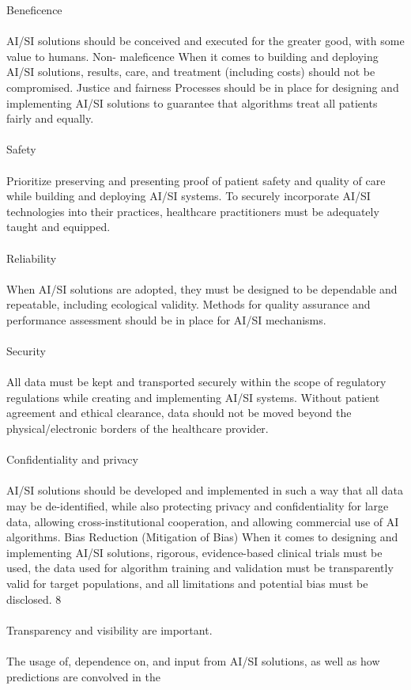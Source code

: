 \documentclass[12pt]{article}
\begin{document}
\noindent Beneficence \\ \\
AI/SI solutions should be conceived and executed for the greater good, with some value to humans. Non- maleficence When it comes to building and deploying AI/SI solutions, results, care, and treatment (including
costs) should not be compromised. Justice and fairness Processes should be in place for designing and
implementing AI/SI solutions to guarantee that algorithms treat all patients fairly and equally.\\ \\Safety\\ \\
Prioritize preserving and presenting proof of patient safety and quality of care while building and deploying AI/SI
systems. To securely incorporate AI/SI technologies into their practices, healthcare practitioners must be
adequately taught and equipped.\\\\ Reliability\\\\
When AI/SI solutions are adopted, they must be designed to be dependable and repeatable, including ecological
validity. Methods for quality assurance and performance assessment should be in place for AI/SI mechanisms. \\\\Security\\\\
All data must be kept and transported securely within the scope of regulatory regulations while creating and
implementing AI/SI systems. Without patient agreement and ethical clearance, data should not be moved
beyond the physical/electronic borders of the healthcare provider. \\\\Confidentiality and privacy\\\\
AI/SI solutions should be developed and implemented in such a way that all data may be de-identified, while
also protecting privacy and confidentiality for large data, allowing cross-institutional cooperation, and allowing
commercial use of AI algorithms. Bias Reduction (Mitigation of Bias)
When it comes to designing and implementing AI/SI solutions, rigorous, evidence-based clinical trials must be
used, the data used for algorithm training and validation must be transparently valid for target populations, and
all limitations and potential bias must be disclosed.
8
\\ \\Transparency and visibility are important.\\\\ The usage of, dependence on, and input from AI/SI solutions, as well as how predictions are convolved in the
\end{document}
